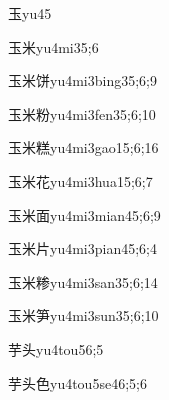 \begin{verbete}{玉}{yu4}{5}
\end{verbete}

\begin{verbete}{玉米}{yu4mi3}{5;6}
\end{verbete}

\begin{verbete}{玉米饼}{yu4mi3bing3}{5;6;9}
\end{verbete}

\begin{verbete}{玉米粉}{yu4mi3fen3}{5;6;10}
\end{verbete}

\begin{verbete}{玉米糕}{yu4mi3gao1}{5;6;16}
\end{verbete}

\begin{verbete}{玉米花}{yu4mi3hua1}{5;6;7}
\end{verbete}

\begin{verbete}{玉米面}{yu4mi3mian4}{5;6;9}
\end{verbete}

\begin{verbete}{玉米片}{yu4mi3pian4}{5;6;4}
\end{verbete}

\begin{verbete}{玉米糁}{yu4mi3san3}{5;6;14}
\end{verbete}

\begin{verbete}{玉米笋}{yu4mi3sun3}{5;6;10}
\end{verbete}

\begin{verbete}{芋头}{yu4tou5}{6;5}
\end{verbete}

\begin{verbete}{芋头色}{yu4tou5se4}{6;5;6}
\end{verbete}

